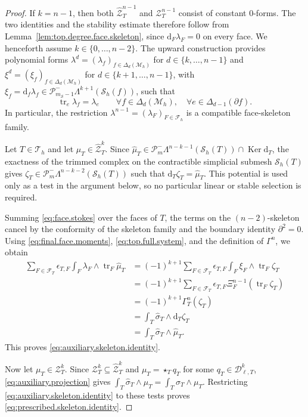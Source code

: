\documentclass[a4paper,11pt]{article}
\theoremstyle{definition}
\newcommand{\DIFF}{\mathrm{d}}
\newcommand{\Mh}{\mathcal{M}_h}
\newcommand{\Sh}{\mathcal{S}_h}
\newcommand{\FM}[1]{\Delta_{#1}}
\newcommand{\PLtrim}[2]{\mathcal{P}_{#1}^{-}\Lambda^{#2}}
\newcommand{\Dpoly}[2]{\mathcal D_{\ell,#1}^{#2}}
\newcommand{\trc}{\operatorname{tr}}
\newcommand{\Ker}{\operatorname{Ker}}
\newcommand{\epsTF}{\epsilon_{T,F}}
\begin{document}
\begin{proof}
If $k=n-1$, then both $\widehat{\mathcal Z}_T^{n-1}$ and $\mathcal Z_T^{n-1}$ consist of constant $0$-forms.
The two identities and the stability estimate therefore follow from Lemma~\ref{lem:top.degree.face.skeleton}, since $\DIFF_F\lambda_F=0$ on every face.
We henceforth assume $k\in\{0,\ldots,n-2\}$.
The upward construction provides polynomial forms $\lambda^d=(\lambda_f)_{f\in\FM{d}(\Mh)}$ for $d\in\{k,\ldots,n-1\}$ and $\xi^d=(\xi_f)_{f\in\FM{d}(\Mh)}$ for $d\in\{k+1,\ldots,n-1\}$, with $\xi_f=\DIFF_f\lambda_f\in\PLtrim{m_{\mathcal S}-1}{k+1}(\Sh(f))$, such that
\[
  \trc_e\lambda_f
  =
  \lambda_e
  \qquad
  \forall
  f\in\FM{d}(\Mh),\quad
  \forall
  e\in\FM{d-1}(\partial f).
\]
In particular, the restriction $\lambda^{n-1} = (\lambda_F)_{F\in\mathcal F_h}$ is a compatible face-skeleton family.

Let $T\in\mathcal T_h$ and let $\widehat\mu_T\in\widehat{\mathcal Z}_T^k$.
Since $\widehat\mu_T \in \PLtrim{m}{n-k-1}(\Sh(T)) \cap \Ker\DIFF_T$, the exactness of the trimmed complex on the contractible simplicial submesh $\Sh(T)$ \cite{Arnold.Falk.ea:06,Arnold.Falk.ea:09} gives $\zeta_T \in \PLtrim{m}{n-k-2}(\Sh(T))$ such that $\DIFF_T\zeta_T = \widehat\mu_T$.
This potential is used only as a test in the argument below, so no particular linear or stable selection is required.

Summing \eqref{eq:face.stokes} over the faces of $T$, the terms on the $(n-2)$-skeleton cancel by the conformity of the skeleton family and the boundary identity $\partial^2=0$.
Using \eqref{eq:final.face.moments}, \eqref{eq:top.full.system}, and the definition of $\Gamma^n$, we obtain
\[
\begin{aligned}
  \sum_{F\in\mathcal F_T}
  \epsTF
  \int_F
  \lambda_F\wedge\trc_F\widehat\mu_T
  &=
  (-1)^{k+1}
  \sum_{F\in\mathcal F_T}
  \epsTF
  \int_F
  \xi_F\wedge\trc_F\zeta_T
  \\
  &=
  (-1)^{k+1}
  \sum_{F\in\mathcal F_T}
  \epsTF
  \Xi_F^{n-1}(\trc_F\zeta_T)
  \\
  &=
  (-1)^{k+1}\Gamma_T^n(\zeta_T)
  \\
  &=
  \int_T
  \widehat\sigma_T\wedge\DIFF_T\zeta_T
  \\
  &=
  \int_T
  \widehat\sigma_T\wedge\widehat\mu_T.
\end{aligned}
\]
This proves \eqref{eq:auxiliary.skeleton.identity}.

Now let $\mu_T\in\mathcal Z_T^k$.
Since $\mathcal Z_T^k\subseteq\widehat{\mathcal Z}_T^k$ and $\mu_T=\star_Tq_T$ for some $q_T\in\Dpoly{T}{k}$, \eqref{eq:auxiliary.projection} gives $\int_T \widehat\sigma_T\wedge\mu_T = \int_T \sigma_T\wedge\mu_T$.
Restricting \eqref{eq:auxiliary.skeleton.identity} to these tests proves \eqref{eq:prescribed.skeleton.identity}.


\end{proof}
\end{document}
